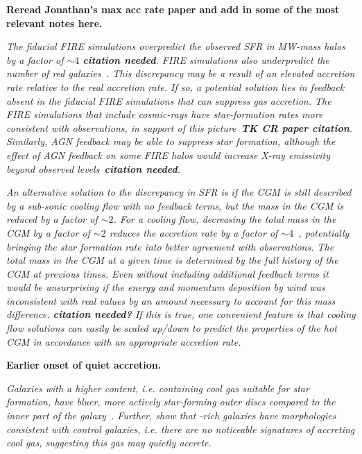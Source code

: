 \documentclass[fleqn,usenatbib]{mnras}
\begin{document}
\textbf{Reread Jonathan's max acc rate paper and add in some of the most relevant notes here.}

\textit{
The fiducial FIRE simulations overpredict the observed SFR in MW-mass halos by a factor of $\sim 4$ \textbf{citation needed}.
FIRE simulations also underpredict the number of red galaxies~\citep{Garrison-Kimmel2017}.
This discrepancy may be a result of an elevated accretion rate relative to the real accretion rate.
If so, a potential solution lies in feedback absent in the fiducial FIRE simulations that can suppress gas accretion.
The FIRE simulations that include cosmic-rays have star-formation rates more consistent with observations, in support of this picture~\textbf{TK CR paper citation}.
Similarly, AGN feedback may be able to suppress star formation, although the effect of AGN feedback on some FIRE halos would increase X-ray emissivity beyond observed levels~\textbf{citation needed}. 
}

\textit{
An alternative solution to the discrepancy in SFR is if the CGM is still described by a sub-sonic cooling flow with no feedback terms, but the mass in the CGM is reduced by a factor of  $\sim2$.
For a cooling flow, decreasing the total mass in the CGM by a factor of $\sim 2$ reduces the accretion rate by a factor of $\sim4$~\cite{Stern2019}, potentially bringing the star formation rate into better agreement with observations.
The total mass in the CGM at a given time is determined by the full history of the CGM at previous times.
Even without including additional feedback terms it would be unsurprising if the energy and momentum deposition by wind was inconsistent with real values by an amount necessary to account for this mass difference. \textbf{citation needed?}
If this is true, one convenient feature is that cooling flow solutions can easily be scaled up/down to predict the properties of the hot CGM in accordance with an appropriate accretion rate.
}

\textbf{
Earlier onset of quiet accretion.
}

\textit{
Galaxies with a higher  content, i.e. containing cool gas suitable for star formation, have bluer, more actively star-forming outer discs compared to the inner part of the galaxy~\citep{Wang2011}.
Further, \citeauthor{Wang2011} show that -rich galaxies have morphologies consistent with control galaxies, i.e. there are no noticeable signatures of accreting cool gas, suggesting this gas may quietly accrete.
}
\end{document}
